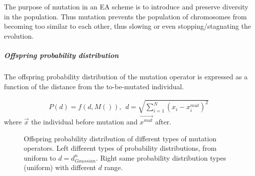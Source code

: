 The purpose of mutation in an EA scheme is to introduce and preserve diversity in the population. Thus mutation prevents the population of chromosomes from becoming too similar to each other, thus slowing or even stopping/stagnating the evolution.    

\subparagraph{Offspring probability distribution} 
The offspring probability distribution of the mutation operator is expressed as a function of the distance from the to-be-mutated individual.

\begin{eqnarray}
	P(d)=f(d,M()),~~ d=\sqrt{\sum _{i=1}^N (x_i-x_i^{mut})^2}   
    \label{prob_eq_mut} 
\end{eqnarray}
where $\overrightarrow{x}$ the individual before mutation and $\overrightarrow{x^{mut}}$ after.


\begin{figure}[h!]
\begin{minipage}[b]{0.5\linewidth}
 \centering
\end{minipage}
\begin{minipage}[b]{0.5\linewidth}
 \centering
\end{minipage}
\caption{Offspring probability distribution of different types of mutation operators. Left different types of probability distributions, from uniform to $d=d_{Gaussian}^n$. Right same probability distribution types (uniform) with different $d$ range.}
\label{Mutation}
\end{figure}


